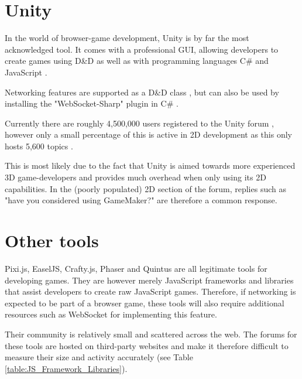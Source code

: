 \documentclass[bsc, 12pt, twoside, singlespacing, parskip, abbrevs, notimes, normalheadings, logo, deptreport]{styles/infthesis}
\begin{document}
\section{Unity}
In the world of browser-game development, Unity is by far the most acknowledged tool. It comes with a professional GUI, allowing developers to create games using D\&D as well as with programming languages C\# and JavaScript \cite{unity_support}.

Networking features are supported as a D\&D class \cite{unity_networking}, but can also be used by installing the "WebSocket-Sharp" plugin in C\# \cite{unity_websocket_sharp}.

Currently there are roughly 4,500,000 users registered \cite{unity_stats} to the Unity forum \cite{unity_forum}, however only a small percentage of this is active in 2D development as this only hosts 5,600 topics \cite{unity_forum_2d}. 

This is most likely due to the fact that Unity is aimed towards more experienced 3D game-developers and provides much overhead when only using its 2D capabilities. In the (poorly populated) 2D section of the forum, replies such as "have you considered using GameMaker?" \cite{unity_suggests_gamemaker} are therefore a common response.


\section{Other tools}
Pixi.js, EaselJS, Crafty.js, Phaser and Quintus are all legitimate tools for developing games. They are however merely JavaScript frameworks and libraries that assist developers to create raw JavaScript games. Therefore, if networking is expected to be part of a browser game, these tools will also require additional resources such as WebSocket for implementing this feature.

Their community is relatively small and scattered across the web. The forums for these tools are hosted on third-party websites and make it therefore difficult to measure their size and activity accurately (see Table \ref{table:JS_Framework_Libraries}).
\end{document}
